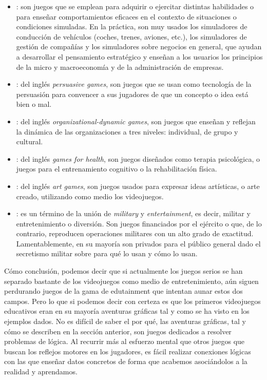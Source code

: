 \begin{itemize}
	\item {}: son juegos que se emplean para adquirir o ejercitar distintas habilidades o para enseñar comportamientos eficaces en el contexto de situaciones o condiciones simuladas. En la práctica, son muy usados los simuladores de conducción de vehículos (coches, trenes, aviones, etc.), los simuladores de gestión de compañías y los simuladores sobre negocios en general, que ayudan a desarrollar el pensamiento estratégico y enseñan a los usuarios los principios de la micro y macroeconomía y de la administración de empresas.
	\item {}: del inglés \emph{persuasive games}, son juegos que se usan como tecnología de la persuasión para convencer a sus jugadores de que un concepto o idea está bien o mal.
	\item {}: del inglés \emph{organizational-dynamic games}, son juegos que enseñan y reflejan la dinámica de las organizaciones a tres niveles: individual, de grupo y cultural.
	\item {}: del inglés \emph{games for health}, son juegos diseñados como terapia psicológica, o juegos para el entrenamiento cognitivo o la rehabilitación física.
	\item {}: del inglés \emph{art games}, son juegos usados para expresar ideas artísticas, o arte creado, utilizando como medio los videojuegos.
	\item {}: es un término de la unión de \emph{military} y \emph{entertainment}, es decir, militar y entretenimiento o diversión. Son juegos financiados por el ejército o que, de lo contrario, reproducen operaciones militares con un alto grado de exactitud. Lamentablemente, en su mayoría son privados para el público general dado el secretismo militar sobre para qué lo usan y cómo lo usan.
\end{itemize}

Cómo conclusión, podemos decir que si actualmente los juegos serios se han separado bastante de los videojuegos como medio de entretenimiento, aún siguen perdurando juegos de la gama de edutainment que intentan aunar estos dos campos. Pero lo que si podemos decir con certeza es que los primeros videojuegos educativos eran en su mayoría aventuras gráficas tal y como se ha visto en los ejemplos dados. No es difícil de saber el por qué, las aventuras gráficas, tal y cómo se describen en la sección anterior, son juegos dedicados a resolver problemas de lógica. Al recurrir más al esfuerzo mental que otros juegos que buscan los reflejos motores en los jugadores, es fácil realizar conexiones lógicas con las que enseñar datos concretos de forma que acabemos asociándolos a la realidad y aprendamos.

